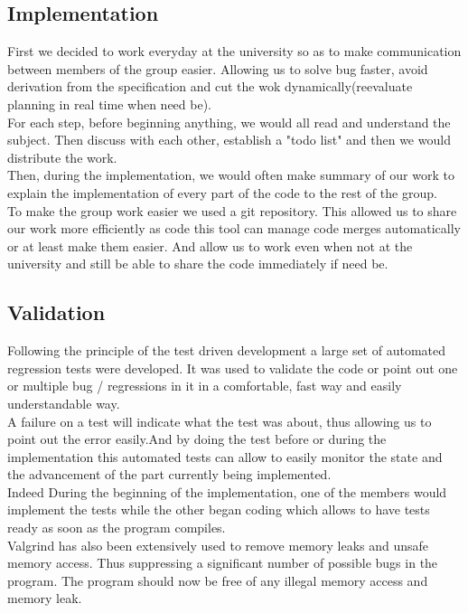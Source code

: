 \subsection{Implementation}
First we decided to work everyday at the university so as to make communication between members of the group easier.
Allowing us to solve bug faster, avoid derivation from the specification and cut the wok dynamically(reevaluate 
planning in real time when need be).\\
For each step, before beginning anything, we would all read and understand the subject. Then discuss with each other,
establish a "todo list" and then we would distribute the work.\\ 
Then, during the implementation, we would often make summary of our work to explain the implementation of every part 
of the code to the rest of the group.\\
To make the group work easier we used a git repository. This allowed us to share our work more efficiently as code
this tool can manage code merges automatically or at least make them easier. And allow us to work even when not
at the university and still be able to share the code immediately if need be.\\

\subsection{Validation}
Following the principle of the test driven development a large set of automated regression tests were developed. 
It was used to validate the code or point out one or multiple bug / regressions in it in a comfortable, fast
way and easily understandable way. \\
A failure on a test will indicate what the test was about, thus allowing us to point out the error easily.And by 
doing the test before or during the implementation this automated tests can allow to easily monitor the state and the
advancement of the part currently being implemented.\\ Indeed During the beginning of the  implementation, one of 
the members would implement the tests while the other began coding which allows to have tests ready as soon as the 
program compiles. \\
Valgrind has also been extensively used to remove memory leaks and unsafe memory access. Thus suppressing a 
significant number of possible bugs in the program. The program should now be free of any illegal memory access
and memory leak.

